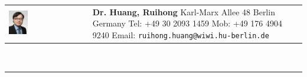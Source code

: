 \documentclass[a4paper,10pt]{article}
\begin{document}
\newcommand{\HU}[0]{Humboldt Universit\"at zu Berlin}
\fancyhf{}
\renewcommand{\headrulewidth}{0pt}
\renewcommand{\footrulewidth}{1pt}
\renewcommand\footrule{\begin{minipage}{1\textwidth}
\hrule width \hsize height 2pt \kern 1mm \hrule width \hsize   
\end{minipage}\par}
\pagestyle{fancy}
\begin{tabular}[h]{p{}p{}}
  \vfill\hspace{-10pt}\includegraphics[width=0.25\textwidth]{bew/ruihong_2013.jpg} &\vspace{1pt}\large{\textbf{Dr. Huang, Ruihong}\newline
  \vspace{-8pt} \newline
Karl-Marx Allee 48 \newline 
10178 Berlin\newline
Germany \newline
Tel: +49 30 2093 1459  \newline
Mob: +49 176 4904 9240 \newline
Email: \verb|ruihong.huang@wiwi.hu-berlin.de| } \\
\end{tabular}\\
\rule[5pt]{1\textwidth}{1pt}\par
\setlength{\tabcolsep}{10pt}
\setlength{\extrarowheight}{6pt}
\end{document}
